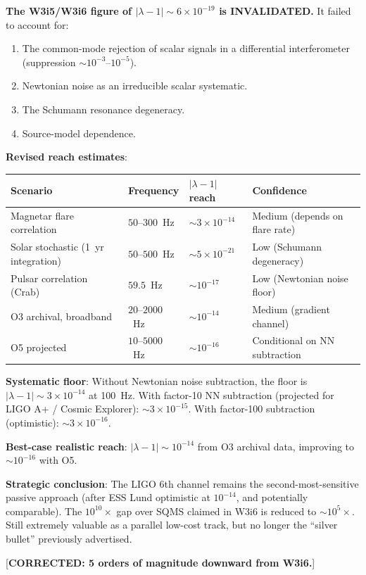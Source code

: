 \documentclass[11pt]{article}
\newcommand{\lam}{\lambda}
\newcommand{\ee}[1]{\times 10^{#1}}
\newcommand{\lbone}{|\lam - 1|}
\theoremstyle{definition}
\theoremstyle{remark}
\begin{document}
\begin{tcolorbox}[colback=red!5!white, colframe=red!60!black,
  title=\textbf{W3i7: LIGO 6th-Channel Honest Assessment}]

\textbf{The W3i5/W3i6 figure of $\lbone \sim 6\ee{-19}$ is
INVALIDATED.} It failed to account for:
\begin{enumerate}[nosep]
\item The common-mode rejection of scalar signals in a differential
  interferometer (suppression $\sim 10^{-3}$--$10^{-5}$).
\item Newtonian noise as an irreducible scalar systematic.
\item The Schumann resonance degeneracy.
\item Source-model dependence.
\end{enumerate}

\textbf{Revised reach estimates}:

\begin{center}
\renewcommand{\arraystretch}{1.25}
\begin{tabular}{@{}llll@{}}
\toprule
\textbf{Scenario} & \textbf{Frequency} & \textbf{$\lbone$ reach} &
  \textbf{Confidence} \\
\midrule
Magnetar flare correlation & $50$--$300$~Hz & $\sim 3\ee{-14}$ &
  Medium (depends on flare rate) \\
Solar stochastic (1~yr integration) & $50$--$500$~Hz & $\sim 5\ee{-21}$ &
  Low (Schumann degeneracy) \\
Pulsar correlation (Crab) & $59.5$~Hz & $\sim 10^{-17}$ &
  Low (Newtonian noise floor) \\
O3 archival, broadband & $20$--$2000$~Hz & $\sim 10^{-14}$ &
  Medium (gradient channel) \\
O5 projected & $10$--$5000$~Hz & $\sim 10^{-16}$ &
  Conditional on NN subtraction \\
\bottomrule
\end{tabular}
\end{center}

\textbf{Systematic floor}: Without Newtonian noise subtraction, the
floor is $\lbone \sim 3\ee{-14}$ at 100~Hz. With factor-10 NN
subtraction (projected for LIGO A+ / Cosmic Explorer): $\sim 3\ee{-15}$.
With factor-100 subtraction (optimistic): $\sim 3\ee{-16}$.

\textbf{Best-case realistic reach}: $\lbone \sim 10^{-14}$
from O3 archival data, improving to $\sim 10^{-16}$ with O5.

\textbf{Strategic conclusion}: The LIGO 6th channel remains the
second-most-sensitive passive approach (after ESS Lund optimistic
at $10^{-14}$, and potentially comparable). The $10^{10}\times$
gap over SQMS claimed in W3i6 is reduced to $\sim 10^{5}\times$.
Still extremely valuable as a parallel low-cost track, but no
longer the ``silver bullet'' previously advertised.

[\textbf{CORRECTED: 5 orders of magnitude downward from W3i6.}]
\end{tcolorbox}
\end{document}
